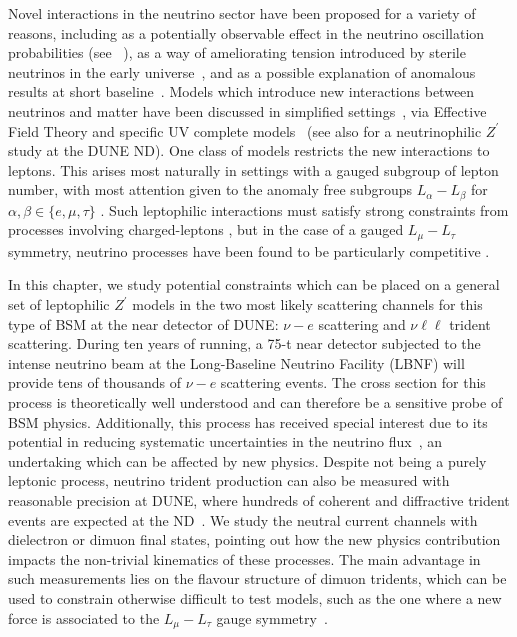 \graphicspath{{}{Zprime_scattering/}{Diagrams/}}

Novel interactions in the neutrino sector have been proposed for a variety of reasons, including as a potentially observable effect in the neutrino oscillation probabilities (see \eg\ \cite{Blennow:2016jkn}), as a way of ameliorating tension introduced by sterile neutrinos in the early universe~\cite{Hannestad:2013ana, Dasgupta:2013zpn,Mirizzi:2014ama,Cherry:2016jol,Capozzi:2017auw,Denton:2018dqq,Chu:2018gxk,Esmaili:2018qzu}, and as a possible explanation of anomalous results at short baseline~\cite{Bertuzzo:2018itn,Ballett:2018ynz,Arguelles:2018mtc}. Models which introduce new interactions between neutrinos and matter have been discussed in simplified settings~\cite{Boehm:2004uq, Cerdeno:2016sfi,Denton:2018xmq}, via Effective Field Theory \cite{Falkowski:2018dmy,Falkowski:2019xoe} and specific UV complete models~\cite{Farzan:2015doa} (see also \cite{Bakhti:2018avv} for a neutrinophilic $Z^\prime$ study at the DUNE ND).
%
One class of models restricts the new interactions to leptons. This arises most naturally in settings with a gauged subgroup of lepton number, with most attention given to the anomaly free subgroups $L_\alpha - L_\beta$ for $\alpha,\beta \in \{e,\mu,\tau\}$ \cite{He:1991qd,He:1990pn}. Such leptophilic interactions must satisfy strong constraints from processes involving charged-leptons \cite{Bauer:2018onh}, but in the case of a gauged $L_\mu - L_\tau$ symmetry, neutrino processes have been found to be particularly competitive \cite{Altmannshofer2014}.

In this chapter, we study potential constraints which can be placed on a general set of leptophilic $Z^\prime$ models in the two most likely scattering channels for this type of BSM at the near detector of DUNE: $\nu-e$ scattering and $\nu\ell\ell$ trident scattering. During ten years of running, a 75-t near detector subjected to the intense neutrino beam at the Long-Baseline Neutrino Facility (LBNF) will provide tens of thousands of $\nu-e$ scattering events. The cross section for this process is theoretically well understood and can therefore be a sensitive probe of BSM physics. Additionally, this process has received special interest due to its potential in reducing systematic uncertainties in the neutrino flux~\cite{Park:2013dax,Bian:2017axs}, an undertaking which can be affected by new physics. Despite not being a purely leptonic process, neutrino trident production can also be measured with reasonable precision at DUNE, where hundreds of coherent and diffractive trident events are expected at the ND~\cite{Ballett:2018uuc}. We study the neutral current channels with dielectron or dimuon final states, pointing out how the new physics contribution impacts the non-trivial kinematics of these processes. The main advantage in such measurements lies on the flavour structure of dimuon tridents, which can be used to constrain otherwise difficult to test models, such as the one where a new force is associated to the $L_\mu-L_\tau$ gauge symmetry~\cite{Altmannshofer2014}.

